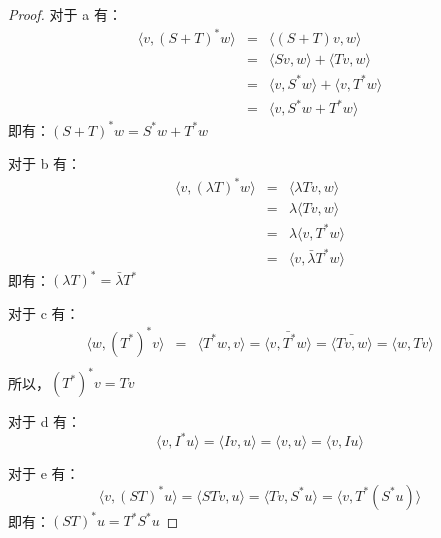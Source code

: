 \documentclass[10pt,a4paper,UTF8]{article}
\begin{document}
\begin{proof}
对于 a 有：
\begin{eqnarray}
\label{eq:3}
\langle v,(S+T)^{*}w \rangle  &=& \langle (S+T)v,w \rangle  \\
&=& \langle Sv,w \rangle  + \langle Tv,w \rangle \\
&=& \langle v,S^{*}w \rangle + \langle v,T^{*}w \rangle \\
&=& \langle v,S^{*}w + T^{*}w \rangle
\end{eqnarray}
即有：\((S+T)^{*}w = S^{*}w + T^{*}w\)

对于 b 有：
\begin{eqnarray}
\label{eq:6}
\langle v,(\lambda T)^{*}w \rangle  &=& \langle \lambda T v,w \rangle  \\
&=&\lambda \langle Tv,w \rangle \\
&=& \lambda \langle v,T^{*}w \rangle \\
&=& \langle v,\bar{\lambda}T^{*}w \rangle
\end{eqnarray}
即有：\((\lambda T)^{*} = \bar{\lambda}T^{*}\)

对于 c 有：
\begin{eqnarray}
\label{eq:7}
\langle w,(T^{*})^{*} v \rangle  &=& \langle T^{*}w,v \rangle = \bar{ \langle v,T^{*}w \rangle  }  =\bar{ \langle Tv, w \rangle  } = \langle w,Tv \rangle  \\
\end{eqnarray}
所以，\((T^{*})^{*} v = Tv\)

对于 d 有：
\begin{equation}
\label{eq:8}
\langle v,I^{*}u \rangle = \langle Iv,u \rangle  = \langle v,u \rangle = \langle v,Iu \rangle
\end{equation}

对于 e 有：
\begin{equation}
\label{eq:9}
\langle v,(ST)^{*}u \rangle = \langle STv,u \rangle = \langle Tv,S^{*}u \rangle = \langle v,T^{*}(S^{*}u) \rangle
\end{equation}
即有：\((ST)^{*}u = T^{*}S^{*}u\)
\end{proof}
\end{document}
